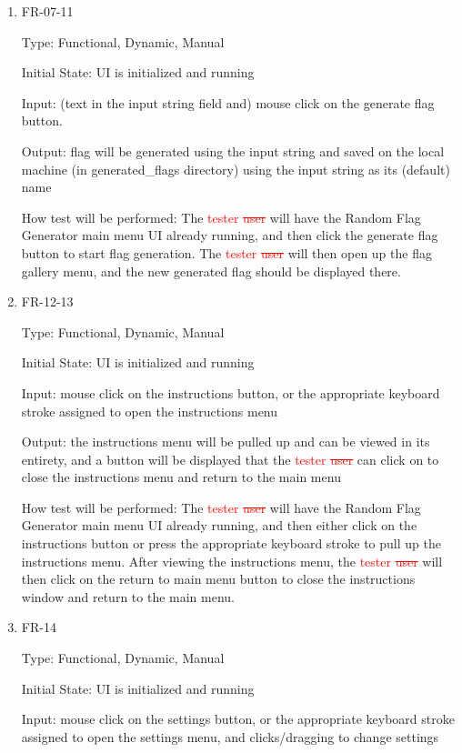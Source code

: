 \documentclass[12pt, titlepage]{article}
\begin{document}
\begin{enumerate}
\item{FR-07-11\\}

Type: Functional, Dynamic, Manual

Initial State: UI is initialized and running

Input: (text in the input string field and) mouse click on the generate flag button.

Output: flag will be generated using the input string and saved on the local
machine (in \/generated\_flags directory) using the input string as its
(default) name

How test will be performed: The \textcolor{red}{tester \sout{user}} will have
the Random Flag Generator main menu UI already running, and then click the
generate flag button to start flag generation. The \textcolor{red}{tester
\sout{user}} will then open up the flag gallery menu, and the new generated
flag should be displayed there.

\item{FR-12-13\\}

Type: Functional, Dynamic, Manual

Initial State: UI is initialized and running

Input: mouse click on the instructions button, or the appropriate keyboard
stroke assigned to open the instructions menu

Output: the instructions menu will be pulled up and can be viewed in its
entirety, and a button will be displayed that the \textcolor{red}{tester
\sout{user}} can click on to close the instructions menu and return to the
main menu

How test will be performed: The \textcolor{red}{tester \sout{user}} will have
the Random Flag Generator main menu UI already running, and then either click
on the instructions button or press the appropriate keyboard stroke to pull up
the instructions menu. After viewing the instructions menu, the
\textcolor{red}{tester \sout{user}} will then click on the return to main menu
button to close the instructions window and return to the main menu.

\item{FR-14\\}

Type: Functional, Dynamic, Manual

Initial State: UI is initialized and running

Input: mouse click on the settings button, or the appropriate keyboard stroke
assigned to open the settings menu, and clicks/dragging to change settings


\end{enumerate}
\end{document}
